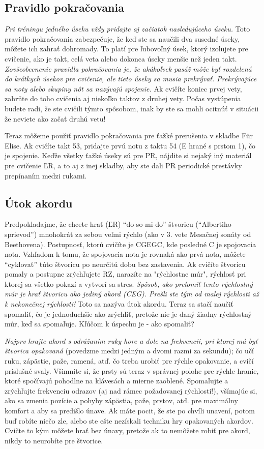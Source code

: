 \subsection{Pravidlo pokračovania}
\emph{Pri tréningu jedného úseku vždy pridajte aj začiatok nasledujúceho úseku.} Toto pravidlo pokračovania zabezpečuje, že keď ste sa naučili dva susedné úseky, môžete ich zahrať dohromady. To platí pre ľubovoľný úsek, ktorý izolujete pre cvičenie, ako je takt, celá veta alebo dokonca úseky  menšie než jeden takt. \emph{Zovšeobecnenie pravidla pokračovania je, že akákoľvek pasáž môže byť rozdelená do krátkych úsekov pre cvičenie, ale tieto úseky sa musia prekrývať. Prekrývajúce sa noty alebo skupiny nôt sa nazývajú spojenie.} Ak cvičíte koniec prvej vety, zahrňte do toho cvičenia aj niekoľko taktov z druhej vety. Počas vystúpenia budete radi, že ste cvičili týmto spôsobom, inak by ste sa mohli ocitnúť v situácii že neviete ako začať druhú vetu!

Teraz môžeme použiť pravidlo pokračovania pre ťažké prerušenia v skladbe Für Elise. Ak cvičíte takt 53, pridajte prvú notu z taktu 54 (E hrané s prstom 1), čo je spojenie. Keďže všetky ťažké úseky sú pre PR, nájdite si nejaký iný materiál pre cvičenie ĽR, a to aj z inej skladby, aby ste dali PR periodické prestávky prepínaním medzi rukami.

\subsection{Útok akordu}
Predpokladajme, že chcete hrať (ĽR) “do-so-mi-do” štvoricu (“Albertiho sprievod”) mnohokrát za sebou veľmi rýchlo (ako v 3. vete Mesačnej sonáty od Beethovena). Postupnosť, ktorú cvičíte je CGEGC, kde posledné C je spojovacia nota. Vzhľadom k tomu, že spojovacia nota je rovnaká ako prvá nota, môžete “cyklovať” túto štvoricu po neurčitú dobu bez zastavenia. Ak cvičíte štvoricu pomaly a postupne zrýchľujete RZ, narazíte na "rýchlostne múr", rýchlosť pri ktorej sa všetko pokazí a vytvorí sa stres. \emph{Spôsob, ako prelomiť tento rýchlostný múr je hrať štvoricu ako jediný akord (CEG). Prešli ste tým od malej rýchlosti až k nekonečnej rýchlosti!} Toto sa nazýva útok akordu. Teraz sa stačí naučiť spomaliť, čo je jednoduchšie ako zrýchliť, pretože nie je daný žiadny rýchlostný múr, keď sa spomaľuje. Kľúčom k úspechu je - ako spomaliť?

\emph{Najprv hrajte akord s odrážaním ruky hore a dole na frekvencii, pri ktorej má byť štvorica opakovaná} (povedzme medzi jedným a dvomi razmi za sekundu); čo učí ruku, zápästie, paže, ramená, atď. čo treba urobiť pre rýchle opakovanie, a cvičí príslušné svaly. Všimnite si, že prsty sú teraz v správnej polohe pre rýchle hranie, ktoré spočívajú pohodlne na klávesách a mierne zaoblené. Spomaľujte a zrýchľujte frekvenciu odrazov (aj nad rámec požadovanej rýchlosti!), všímajúc si, ako sa zmenia pozície a pohyby zápästia, paže, prstov, atď. pre maximálny komfort a aby sa predišlo únave. Ak máte pocit, že ste po chvíli unavení, potom buď robíte niečo zle, alebo ste ešte nezískali techniku hry opakovaných akordov. Cvičte to kým môžete hrať bez únavy, pretože ak to nemôžete robiť pre akord, nikdy to neurobíte pre štvorice.


